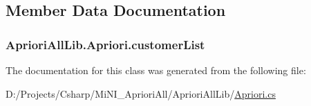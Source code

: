 \subsection{Member Data Documentation}
\hypertarget{class_apriori_all_lib_1_1_apriori_abbca8be3761136e76782ce10ebd61638}{
\subsubsection[{customer\-List}]{ Apriori\-All\-Lib.\-Apriori.\-customer\-List\hspace{0.3cm}{\ttfamily [private]}}}\label{class_apriori_all_lib_1_1_apriori_abbca8be3761136e76782ce10ebd61638}


The documentation for this class was generated from the following file\-:\begin{DoxyCompactItemize}
\item 
D\-:/\-Projects/\-Csharp/\-Mi\-N\-I\-\_\-\-Apriori\-All/\-Apriori\-All\-Lib/\hyperlink{_apriori_8cs}{Apriori.\-cs}\end{DoxyCompactItemize}
